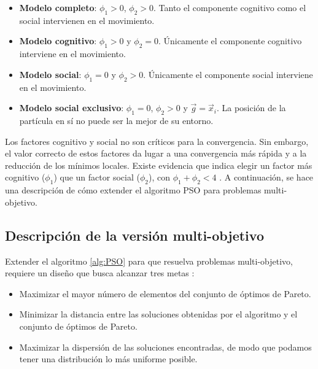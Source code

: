     \begin{itemize}
     \item \textbf{Modelo completo}: $\phi_1 > 0$, $\phi_2 > 0$. Tanto el componente cognitivo como el social intervienen en el movimiento.
     \item \textbf{Modelo cognitivo}: $\phi_1 > 0$ y $\phi_2 = 0$. \'Unicamente el componente cognitivo interviene en el movimiento.
     \item \textbf{Modelo social}: $\phi_1 = 0$ y $\phi_2 > 0$. \'Unicamente el componente social interviene en el movimiento.
     \item \textbf{Modelo social exclusivo}: $\phi_1 = 0$, $\phi_2 > 0$ y $\vec{g} = \vec{x}_i$. La posici\'on de la part\'icula en s\'i no puede 
     ser la mejor de su entorno.

    \end{itemize}

    Los factores cognitivo y social no son cr\'iticos para la convergencia. Sin embargo, el valor correcto de estos 
    factores da lugar a una convergencia m\'as r\'apida y a la reducci\'on de los m\'inimos locales. Existe evidencia 
    que indica elegir un factor m\'as cognitivo ($\phi_1$) que un factor social ($\phi_2$), con $\phi_1 + \phi_2 < 4$ 
    \cite{Maurice11}. A continuaci\'on, se hace una descripci\'on de c\'omo extender el algoritmo PSO para problemas multi-objetivo.
    
  \subsection{Descripci\'on de la versi\'on multi-objetivo}
  
  Extender el algoritmo \ref{alg:PSO} para que resuelva problemas multi-objetivo, requiere un dise\~no que busca alcanzar tres metas
  \cite{Nik11}:
  
  \begin{itemize}
   \item Maximizar el mayor n\'umero de elementos del conjunto de \'optimos de Pareto.
   \item Minimizar la distancia entre las soluciones obtenidas por el algoritmo y el conjunto de \'optimos de Pareto.
   \item Maximizar la dispersi\'on de las soluciones encontradas, de modo que podamos tener una distribuci\'on lo m\'as 
	uniforme posible.
  \end{itemize}

